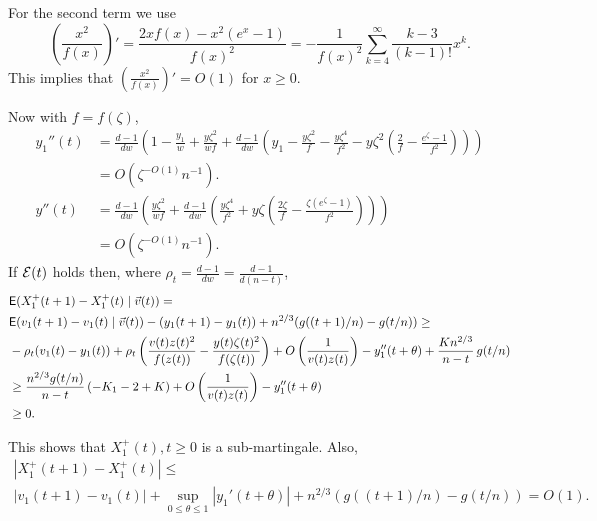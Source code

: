 \documentclass[11pt]{article}
\def\cE{{\cal E}}
\def\z{\zeta}
\def\th{\theta}
\def\r{\rho}
\def\E{{\sf E}}
\def\vv{\vec{v}}
\newcommand{\brac}[1]{\left(#1\right)}
\newcommand{\bfrac}[2]{\brac{\frac{#1}{#2}}}
\begin{document}
For the second term we use 
$$\bfrac{x^2}{f(x)}'=\frac{2xf(x)-x^2(e^x-1)}{f(x)^2}=-\frac{1}{f(x)^2}\sum_{k=4}^\infty\frac{k-3}{(k-1)!}x^k.$$ 
This implies that $\bfrac{x^2}{f(x)}'=O(1)$ for $x\geq 0$.

Now with $f=f(\z)$,
\begin{align*}
y_1''(t)&=
\frac{d-1}{dw}\brac{1-\frac{y_1}{w}+\frac{y\z^2}{wf}+\frac{d-1}{dw}\brac{y_1-\frac{y\z^2}{f}-\frac{y\z^4}{f^2}-
y\z^2\brac{\frac{2}{f}
-\frac{e^\z-1}{f^2}}}}\\
&=O(\z^{-O(1)}n^{-1}).\\
y''(t)&=
\frac{d-1}{dw}\brac{\frac{y\z^2}{wf}+\frac{d-1}{dw}\brac{\frac{y\z^4}{f^2}+y\z\brac{\frac{2\z}{f}
-\frac{\z(e^\z-1)}{f^2}}}}\\
&=O(\z^{-O(1)}n^{-1}).
\end{align*}
If $\cE(t)$ holds then, where $\r_t=\frac{d-1}{dw}=\frac{d-1}{d(n-t)}$,
\begin{align*}
&\E(X_1^+(t+1)-X_1^+(t)\mid \vv(t))=\\
&\E(v_1(t+1)-v_1(t)\mid \vv(t))-(y_1(t+1)-y_1(t))+n^{2/3}(g((t+1)/n)-g(t/n))\geq\\
&- \r_{t}(v_1(t)-y_1(t)) + \r_{t}\brac{\frac{v(t)z(t)^2}{f(z(t))}-\frac{y(t)\z(t)^2}{f(\z(t))}} 
+ O\bfrac{1}{v(t)z(t)} - y_1''(t+\th)+\frac{Kn^{2/3}}{n-t}\,g(t/n)\\
&\geq \frac{n^{2/3}g(t/n)}{n-t}\brac{-K_1-2+K}+ O\bfrac{1}{v(t)z(t)} - y_1''(t+\th)\\
&\geq 0.
\end{align*}

This shows that $X_1^+(t),t\geq 0$ is a sub-martingale. Also,
\begin{multline*}
|X_1^+(t+1)-X_1^+(t)|\leq \\
|v_1(t+1)-v_1(t)|+\sup_{0\leq\th\leq 1}|y_1'(t+\th)|+n^{2/3}(g((t+1)/n)-g(t/n))=O(1 ).
\end{multline*}
\end{document}
